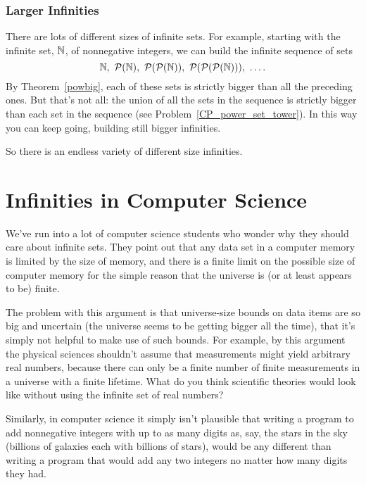 \subsubsection{Larger Infinities}

There are lots of different sizes of infinite sets.  For example, starting
with the infinite set, $\mathbb{N}$, of nonnegative integers, we can build
the infinite sequence of sets
\[
\naturals,\ \power(\naturals),\ \power(\power(\naturals)),\
\power(\power(\power(\naturals))),\ \dots.
\]
By Theorem~\ref{powbig}, each of these sets is strictly bigger than all
the preceding ones.  But that's not all: the union of all the sets in the
sequence is strictly bigger than each set in the sequence
(see Problem~\ref{CP_power_set_tower}).  In this way you can keep going,
building still bigger infinities.

So there is an endless variety of different size infinities.

\section{Infinities in Computer Science}

We've run into a lot of computer science students who wonder why they
should care about infinite sets.  They point out that any data set in
a computer memory is limited by the size of memory, and there is a
finite limit on the possible size of computer memory for the simple
reason that the universe is (or at least appears to be) finite.

\iffalse need to learn all this abstract theory of infinite sets, and this
is a good question.  \fi

The problem with this argument is that universe-size bounds on data
items are so big and uncertain (the universe seems to be getting
bigger all the time), that it's simply not helpful to make use of such
bounds.  For example, by this argument the physical sciences shouldn't
assume that measurements might yield arbitrary real numbers, because
there can only be a finite number of finite measurements in a universe
with a finite lifetime.  What do you think scientific theories would
look like without using the infinite set of real numbers?

Similarly, in computer science it simply isn't plausible that writing
a program to add nonnegative integers with up to as many digits as,
say, the stars in the sky (billions of galaxies each with billions of
stars), would be any different than writing a program that would add
any two integers no matter how many digits they had.

